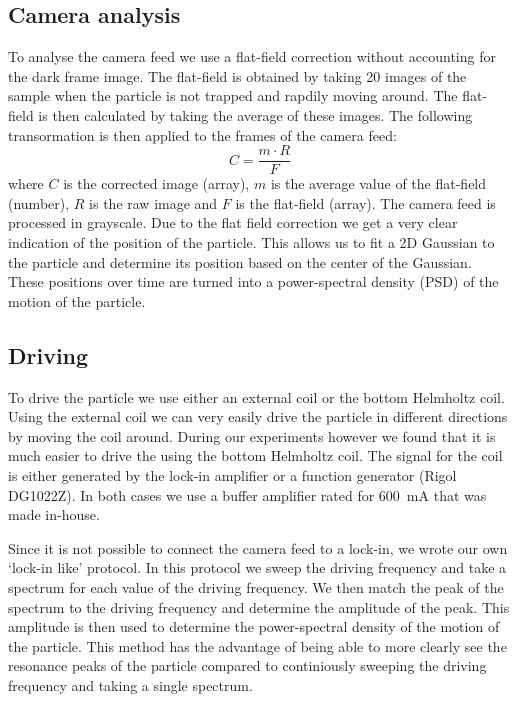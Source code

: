 \subsection{Camera analysis}
To analyse the camera feed we use a flat-field correction without accounting for the dark frame image. The flat-field is obtained by taking 20 images of the sample when the particle is not trapped and rapdily moving around. The flat-field is then calculated by taking the average of these images. The following transormation is then applied to the frames of the camera feed:
\begin{equation}
    C = \frac{m \cdot R}{F}
    \tag{flat-field correction}
    \label{eq:flat-field-correction}
\end{equation}
where $C$ is the corrected image (array), $m$ is the average value of the flat-field (number), $R$ is the raw image and $F$ is the flat-field (array). The camera feed is processed in grayscale. Due to the flat field correction we get a very clear indication of the position of the particle. This allows us to fit a 2D Gaussian to the particle and determine its position based on the center of the Gaussian. These positions over time are turned into a power-spectral density (PSD) of the motion of the particle.

\subsection{Driving}
To drive the particle we use either an external coil or the bottom Helmholtz coil. Using the external coil we can very easily drive the particle in different directions by moving the coil around. During our experiments however we found that it is much easier to drive the \zmode using the bottom Helmholtz coil. The signal for the coil is either generated by the lock-in amplifier or a function generator (Rigol DG1022Z). In both cases we use a buffer amplifier rated for \qty{600}{\milli\ampere} that was made in-house.

Since it is not possible to connect the camera feed to a lock-in, we wrote our own `lock-in like' protocol. In this protocol we sweep the driving frequency and take a spectrum for each value of the driving frequency. We then match the peak of the spectrum to the driving frequency and determine the amplitude of the peak. This amplitude is then used to determine the power-spectral density of the motion of the particle. This method has the advantage of being able to more clearly see the resonance peaks of the particle compared to continiously sweeping the driving frequency and taking a single spectrum.
